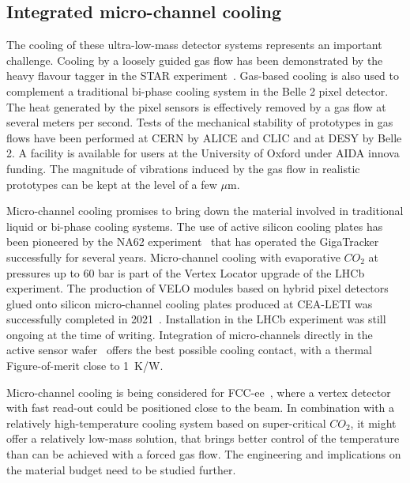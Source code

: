 \subsection{Integrated micro-channel cooling}
\label{sec:det-micro-channels}
 


The cooling of these ultra-low-mass detector systems represents an important challenge.
Cooling by a loosely guided gas flow has been demonstrated by the heavy flavour tagger in the STAR experiment~\cite{STAR:2002eio}. Gas-based cooling is also used to complement a traditional bi-phase cooling system in the Belle 2 pixel detector. The heat generated by the pixel sensors is effectively removed by a gas flow at several meters per second. Tests of the mechanical stability of prototypes in gas flows have been performed at CERN by ALICE and CLIC and at DESY by Belle 2. A facility is available for users at the University of Oxford under AIDA innova funding. The magnitude of vibrations induced by the gas flow in realistic prototypes can be kept at the level of a few $\mu\mathrm{m}$.

Micro-channel cooling promises to bring down the material involved in traditional liquid or bi-phase cooling systems. The use of active silicon cooling plates has been pioneered by the NA62 experiment~\cite{NA62:2017rwk} that has operated the GigaTracker successfully for several years. Micro-channel cooling with evaporative $CO_2$ at pressures up to 60 bar is part of the Vertex Locator upgrade of the LHCb experiment. The production of VELO modules based on hybrid pixel detectors glued onto silicon micro-channel cooling plates produced at CEA-LETI was successfully completed in 2021~\cite{Francisco:2021tda}. Installation in the LHCb experiment was still ongoing at the time of writing. Integration of micro-channels directly in the active sensor wafer~\cite{Andricek:2016rsq, Mapelli:2712079} offers the best possible cooling contact, with a thermal Figure-of-merit close to 1~K/W. 

Micro-channel cooling is being considered for FCC-ee~\cite{Barchetta:2021ibt}, where a vertex detector with fast read-out could be positioned close to the beam. In combination with a relatively high-temperature cooling system based on super-critical $CO_{2}$, it might offer a relatively low-mass solution, that brings better control of the temperature than can be achieved with a forced gas flow. The engineering and implications on the material budget need to be studied further.


